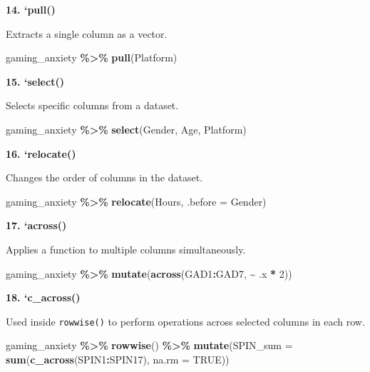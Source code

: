 \documentclass[
]{book}
\newenvironment{Shaded}{\begin{snugshade}}{\end{snugshade}}
\newcommand{\AttributeTok}[1]{\textcolor[rgb]{0.13,0.29,0.53}{#1}}
\newcommand{\ConstantTok}[1]{\textcolor[rgb]{0.56,0.35,0.01}{#1}}
\newcommand{\DecValTok}[1]{\textcolor[rgb]{0.00,0.00,0.81}{#1}}
\newcommand{\FunctionTok}[1]{\textcolor[rgb]{0.13,0.29,0.53}{\textbf{#1}}}
\newcommand{\NormalTok}[1]{#1}
\newcommand{\SpecialCharTok}[1]{\textcolor[rgb]{0.81,0.36,0.00}{\textbf{#1}}}
\begin{document}
\textbf{14. `pull()}

Extracts a single column as a vector.

\begin{Shaded}
\begin{Highlighting}[]
\NormalTok{gaming\_anxiety }\SpecialCharTok{\%\textgreater{}\%}
  \FunctionTok{pull}\NormalTok{(Platform)}
\end{Highlighting}
\end{Shaded}

\textbf{15. `select()}

Selects specific columns from a dataset.

\begin{Shaded}
\begin{Highlighting}[]
\NormalTok{gaming\_anxiety }\SpecialCharTok{\%\textgreater{}\%}
  \FunctionTok{select}\NormalTok{(Gender, Age, Platform)}
\end{Highlighting}
\end{Shaded}

\textbf{16. `relocate()}

Changes the order of columns in the dataset.

\begin{Shaded}
\begin{Highlighting}[]
\NormalTok{gaming\_anxiety }\SpecialCharTok{\%\textgreater{}\%}
  \FunctionTok{relocate}\NormalTok{(Hours, }\AttributeTok{.before =}\NormalTok{ Gender)}
\end{Highlighting}
\end{Shaded}

\textbf{17. `across()}

Applies a function to multiple columns simultaneously.

\begin{Shaded}
\begin{Highlighting}[]
\NormalTok{gaming\_anxiety }\SpecialCharTok{\%\textgreater{}\%}
  \FunctionTok{mutate}\NormalTok{(}\FunctionTok{across}\NormalTok{(GAD1}\SpecialCharTok{:}\NormalTok{GAD7, }\SpecialCharTok{\textasciitilde{}}\NormalTok{ .x }\SpecialCharTok{*} \DecValTok{2}\NormalTok{))}
\end{Highlighting}
\end{Shaded}

\textbf{18. `c\_across()}

Used inside \texttt{rowwise()} to perform operations across selected columns in each row.

\begin{Shaded}
\begin{Highlighting}[]
\NormalTok{gaming\_anxiety }\SpecialCharTok{\%\textgreater{}\%}
  \FunctionTok{rowwise}\NormalTok{() }\SpecialCharTok{\%\textgreater{}\%}
  \FunctionTok{mutate}\NormalTok{(}\AttributeTok{SPIN\_sum =} \FunctionTok{sum}\NormalTok{(}\FunctionTok{c\_across}\NormalTok{(SPIN1}\SpecialCharTok{:}\NormalTok{SPIN17), }\AttributeTok{na.rm =} \ConstantTok{TRUE}\NormalTok{))}
\end{Highlighting}
\end{Shaded}
\end{document}
